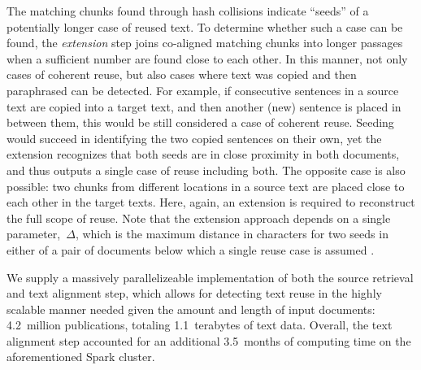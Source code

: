 The matching chunks found through hash collisions indicate ``seeds'' of a potentially longer case of reused text. To determine whether such a case can be found, the \emph{extension} step joins co-aligned matching chunks into longer passages when a sufficient number are found close to each other. In this manner, not only cases of coherent reuse, but also cases where text was copied and then paraphrased can be detected. For example, if consecutive sentences in a source text are copied into a target text, and then another (new) sentence is placed in between them, this would be still considered a case of coherent reuse. Seeding would succeed in identifying the two copied sentences on their own, yet the extension recognizes that both seeds are in close proximity in both documents, and thus outputs a single case of reuse including both. The opposite case is also possible: two chunks from different locations in a source text are placed close to each other in the target texts. Here, again, an extension is required to reconstruct the full scope of reuse. Note that the extension approach depends on a single parameter,~$\Delta$, which is the maximum distance in characters for two seeds in either of a pair of documents below which a single reuse case is assumed \cite{stamatatos:2011}.

We supply a massively parallelizeable implementation of both the source retrieval and text alignment step, which allows for detecting text reuse in the highly scalable manner needed given the amount and length of input documents: 4.2~million publications, totaling 1.1~terabytes of text data. Overall, the text alignment step accounted for an additional 3.5~months of computing time on the aforementioned Spark cluster.

